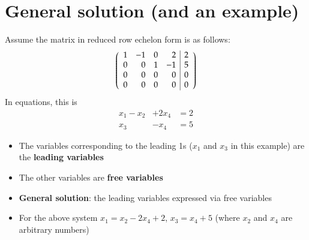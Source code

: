 \documentclass{article}[18pt]
\begin{document}
\section{General solution (and an example)}
Assume the matrix in reduced row echelon form is as follows:
$$\left( \begin{array} { r r r r | r } { 1 } & { - 1 } & { 0 } & { 2 } & { 2 } \\ { 0 } & { 0 } & { 1 } & { - 1 } & { 5 } \\ { 0 } & { 0 } & { 0 } & { 0 } & { 0 } \\ { 0 } & { 0 } & { 0 } & { 0 } & { 0 } \end{array} \right)$$
In equations, this is
$$\begin{aligned} x _ { 1 } - x _ { 2 } & + 2 x _ { 4 } & = 2 \\ x _ { 3 } & - x _ { 4 } & = 5 \end{aligned}$$
\begin{itemize}
\item The variables corresponding to the leading 1s ($x_1$ and $x_3$ in this example) are the \textbf{leading variables}
\item The other variables are \textbf{free variables}
\item \textbf{General solution}: the leading variables expressed via free variables
\item For the above system $x_1=x_2-2x_4+2$, $x_3=x_4+5$ (where $x_2$ and $x_4$ are arbitrary numbers)
\end{itemize}
\end{document}
